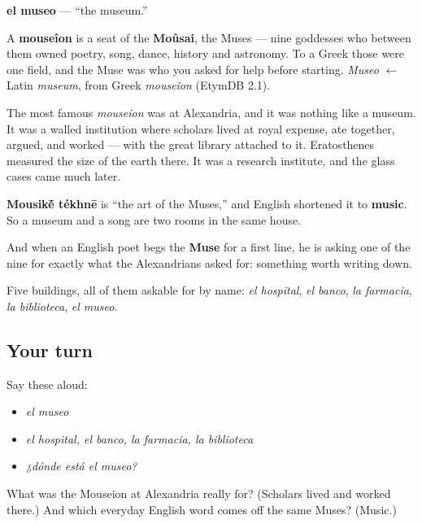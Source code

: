 \begin{cousinweb}
\textbf{el museo} — \textquotedblleft{}the museum.\textquotedblright{}

A \textbf{mouseîon} is a seat of the \textbf{Moûsai}, the Muses — nine goddesses who between them owned poetry, song, dance, history and astronomy. To a Greek those were one field, and the Muse was who you asked for help before starting. \emph{Museo} $\leftarrow$ Latin \emph{museum}, from Greek \emph{mouseîon} (EtymDB 2.1).

The most famous \emph{mouseion} was at Alexandria, and it was nothing like a museum. It was a walled institution where scholars lived at royal expense, ate together, argued, and worked — with the great library attached to it. Eratosthenes measured the size of the earth there. It was a research institute, and the glass cases came much later.

\textbf{Mousik\'{\={e}} tékhnē} is \textquotedblleft{}the art of the Muses,\textquotedblright{} and English shortened it to \textbf{music}. So a museum and a song are two rooms in the same house.

And when an English poet begs the \textbf{Muse} for a first line, he is asking one of the nine for exactly what the Alexandrians asked for: something worth writing down.
\end{cousinweb}

\begin{grammarlens}[title={What you've built}]
Five buildings, all of them askable for by name: \emph{el hospital}, \emph{el banco}, \emph{la farmacia}, \emph{la biblioteca}, \emph{el museo}.
\end{grammarlens}

\subsection*{Your turn}
Say these aloud:

\begin{itemize}
\raggedright
  \item \emph{el museo}
  \item \emph{el hospital, el banco, la farmacia, la biblioteca}
  \item \emph{¿dónde está el museo?}
\end{itemize}

\begin{tcolorbox}[breakable,colback=teal!4,colframe=teal!35!black,title={Before you move on}]
What was the Mouseion at Alexandria really for? (Scholars lived and worked there.) And which everyday English word comes off the same Muses? (Music.)
\end{tcolorbox}
